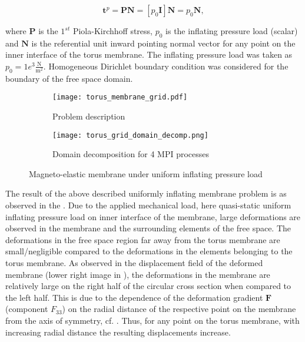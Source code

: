 \begin{equation}
\mathbf{t}^p = \mathbf{P}\mathbf{N} = \left[ p_0 \mathbf{I} \right] \mathbf{N} = p_0 \mathbf{N},
\end{equation}

\noindent where $\mathbf{P}$ is the $1^{st}$ Piola-Kirchhoff stress, $p_0$ is the inflating pressure load (scalar) and $\mathbf{N}$ is the referential unit inward pointing normal vector for any point on the inner interface of the torus membrane. The inflating pressure load was taken as $p_0 = 1e^{3} \frac{\text{N}}{\text{m}^2}$. Homogeneous Dirichlet boundary condition was considered for the boundary of the free space domain.\par 

\begin{figure}[h]
\centering 
\begin{subfigure}[b]{0.6\textwidth}
\centering
\texttt{[image: torus\_membrane\_grid.pdf]}
\caption{\scriptsize{Problem description}}
\label{fig:2.7.1}
\end{subfigure}
\begin{subfigure}[b]{0.39\textwidth}
\centering
\texttt{[image: torus\_grid\_domain\_decomp.png]}
\caption{\scriptsize{Domain decomposition for 4 MPI processes}}
\label{fig:2.7.2}
\end{subfigure}
\caption{Magneto-elastic membrane under uniform inflating pressure load}
\label{fig:2.7}
\end{figure} 

The result of the above described uniformly inflating membrane problem is as observed in the . Due to the applied mechanical load, here quasi-static uniform inflating pressure load on inner interface of the membrane, large deformations are observed in the membrane and the surrounding elements of the free space. The deformations in the free space region far away from the torus membrane are small/negligible compared to the deformations in the elements belonging to the torus membrane. As observed in the displacement field of the deformed membrane (lower right image in ), the deformations in the membrane are relatively large on the right half of the circular cross section when compared to the left half. This is due to the dependence of the deformation gradient $\mathbf{F}$ (component $F_{33}$) on the radial distance of the respective point on the membrane from the axis of symmetry, cf. . Thus, for any point on the torus membrane, with increasing radial distance the resulting displacements increase. \par  

